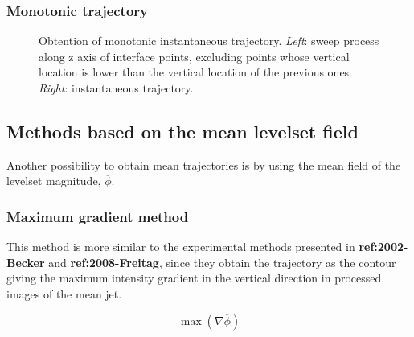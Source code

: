 \subsubsection*{Monotonic trajectory}


\begin{figure}[ht]
     \centering
     \begin{subfigure}[b]{0.45\textwidth}
         \centering
     \end{subfigure}
     \begin{subfigure}[b]{0.45\textwidth}
         \centering
     \end{subfigure}
        \caption{Obtention of monotonic instantaneous trajectory. \textsl{Left}: sweep process along z axis of interface points, excluding points whose vertical location is lower than the vertical location of the previous ones. \textsl{Right}: instantaneous trajectory.}
        \label{fig:trajectory_obtention_instantaneous_method_b}
\end{figure}


\subsection{Methods based on the mean levelset field}

Another possibility to obtain mean trajectories is by using the mean field of the levelset magnitude, $\overline{\phi}$. 

\subsubsection*{Maximum gradient method}

This method is more similar to the experimental methods presented in \textbf{ref:2002-Becker} and \textbf{ref:2008-Freitag}, since they obtain the trajectory as the contour giving the maximum intensity gradient in the vertical direction in processed images of the mean jet.

\begin{equation}
\max \left( \nabla \overline{\phi} \right)
\end{equation}

